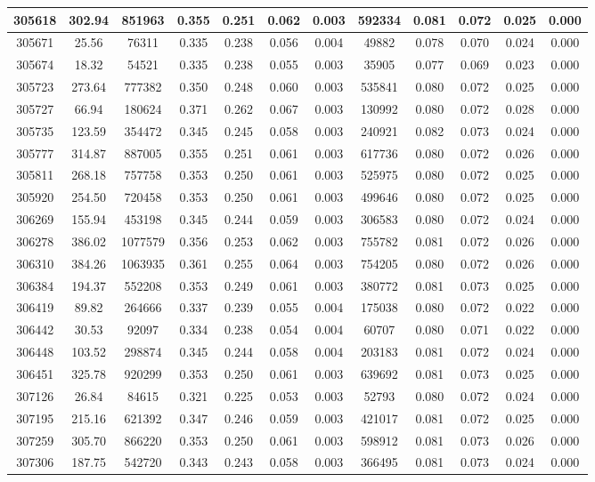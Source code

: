 \documentclass[10pt]{extarticle}
\begin{document}
\begin{longtable}{|c|c|c|c|c|c|c|c|c|c|c|c|}
\hline 
305618&302.94&851963&0.355&0.251&0.062&0.003&592334&0.081&0.072&0.025&0.000 \\ 
\hline 
305671&25.56&76311&0.335&0.238&0.056&0.004&49882&0.078&0.070&0.024&0.000 \\ 
\hline 
305674&18.32&54521&0.335&0.238&0.055&0.003&35905&0.077&0.069&0.023&0.000 \\ 
\hline 
305723&273.64&777382&0.350&0.248&0.060&0.003&535841&0.080&0.072&0.025&0.000 \\ 
\hline 
305727&66.94&180624&0.371&0.262&0.067&0.003&130992&0.080&0.072&0.028&0.000 \\ 
\hline 
305735&123.59&354472&0.345&0.245&0.058&0.003&240921&0.082&0.073&0.024&0.000 \\ 
\hline 
305777&314.87&887005&0.355&0.251&0.061&0.003&617736&0.080&0.072&0.026&0.000 \\ 
\hline 
305811&268.18&757758&0.353&0.250&0.061&0.003&525975&0.080&0.072&0.025&0.000 \\ 
\hline 
305920&254.50&720458&0.353&0.250&0.061&0.003&499646&0.080&0.072&0.025&0.000 \\ 
\hline 
306269&155.94&453198&0.345&0.244&0.059&0.003&306583&0.080&0.072&0.024&0.000 \\ 
\hline 
306278&386.02&1077579&0.356&0.253&0.062&0.003&755782&0.081&0.072&0.026&0.000 \\ 
\hline 
306310&384.26&1063935&0.361&0.255&0.064&0.003&754205&0.080&0.072&0.026&0.000 \\ 
\hline 
306384&194.37&552208&0.353&0.249&0.061&0.003&380772&0.081&0.073&0.025&0.000 \\ 
\hline 
306419&89.82&264666&0.337&0.239&0.055&0.004&175038&0.080&0.072&0.022&0.000 \\ 
\hline 
306442&30.53&92097&0.334&0.238&0.054&0.004&60707&0.080&0.071&0.022&0.000 \\ 
\hline 
306448&103.52&298874&0.345&0.244&0.058&0.004&203183&0.081&0.072&0.024&0.000 \\ 
\hline 
306451&325.78&920299&0.353&0.250&0.061&0.003&639692&0.081&0.073&0.025&0.000 \\ 
\hline 
307126&26.84&84615&0.321&0.225&0.053&0.003&52793&0.080&0.072&0.024&0.000 \\ 
\hline 
307195&215.16&621392&0.347&0.246&0.059&0.003&421017&0.081&0.072&0.025&0.000 \\ 
\hline 
307259&305.70&866220&0.353&0.250&0.061&0.003&598912&0.081&0.073&0.026&0.000 \\ 
\hline 
307306&187.75&542720&0.343&0.243&0.058&0.003&366495&0.081&0.073&0.024&0.000 \\ 

\end{longtable}
\end{document}
